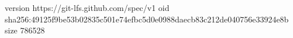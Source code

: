 version https://git-lfs.github.com/spec/v1
oid sha256:49125f9be53b02835c501e74efbc5d0e0988daecb83c212de040756e33924e8b
size 786528
